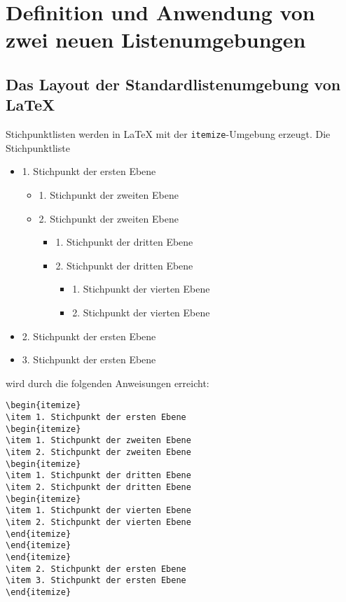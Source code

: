 \section{Definition und Anwendung von zwei neuen Listenumgebungen}

\subsection{Das Layout der Standardlistenumgebung von \LaTeX}

Stichpunktlisten werden in \LaTeX{} mit der \verb+itemize+-Umgebung erzeugt. 
Die Stichpunktliste 

\begin{itemize}
\item 1. Stichpunkt der ersten Ebene
\begin{itemize}
\item 1. Stichpunkt der zweiten Ebene
\item 2. Stichpunkt der zweiten Ebene
\begin{itemize}
\item 1. Stichpunkt der dritten Ebene
\item 2. Stichpunkt der dritten Ebene
\begin{itemize}
\item 1. Stichpunkt der vierten Ebene
\item 2. Stichpunkt der vierten Ebene
\end{itemize}
\end{itemize}
\end{itemize}
\item 2. Stichpunkt der ersten Ebene
\item 3. Stichpunkt der ersten Ebene
\end{itemize}

wird durch die folgenden Anweisungen erreicht:

\vspace*{-\baselineskip}

\begin{verbatim}
\begin{itemize}
\item 1. Stichpunkt der ersten Ebene
\begin{itemize}
\item 1. Stichpunkt der zweiten Ebene
\item 2. Stichpunkt der zweiten Ebene
\begin{itemize}
\item 1. Stichpunkt der dritten Ebene
\item 2. Stichpunkt der dritten Ebene
\begin{itemize}
\item 1. Stichpunkt der vierten Ebene
\item 2. Stichpunkt der vierten Ebene
\end{itemize}
\end{itemize}
\end{itemize}
\item 2. Stichpunkt der ersten Ebene
\item 3. Stichpunkt der ersten Ebene
\end{itemize}
\end{verbatim}


